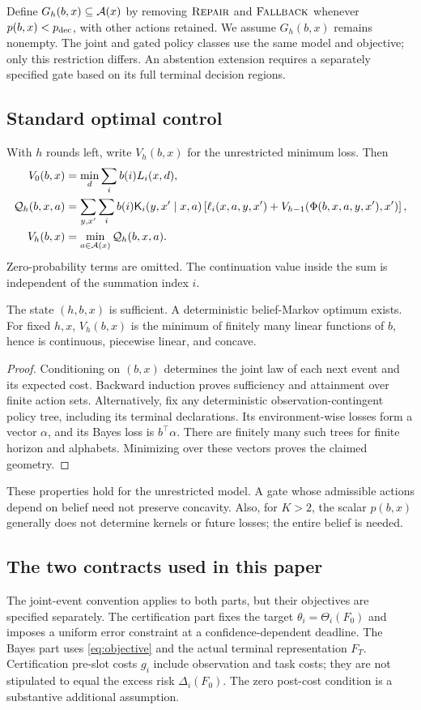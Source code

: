 Define $G_h(b,x)\subseteq\mathcal A(x)$ by removing $\textsc{Repair}$ and $\textsc{Fallback}$ whenever
$p(b,x)<p_{\mathrm{dec}}$, with other actions retained. We assume $G_h(b,x)$ remains
nonempty. The joint and gated policy classes use the same model and objective;
only this restriction differs. An abstention extension requires a separately
specified gate based on its full terminal decision regions.

\subsection{Standard optimal control}
With $h$ rounds left, write $V_h(b,x)$ for the unrestricted minimum loss.
Then
\begin{align}
V_0(b,x)&=\min_d\sum_i b(i)L_i(x,d),\\
\mathcal Q_h(b,x,a)&=\sum_{y,x'}\sum_i b(i)\mathsf K_i(y,x'\mid x,a)
 \left[\ell_i(x,a,y,x')+V_{h-1}(\Phi(b,x,a,y,x'),x')\right],\\
V_h(b,x)&=\min_{a\in\mathcal A(x)}\mathcal Q_h(b,x,a).
\label{eq:bellman}
\end{align}
Zero-probability terms are omitted. The continuation value inside the sum is
independent of the summation index $i$.

\begin{proposition}
\label{prop:standard}
The state $(h,b,x)$ is sufficient. A deterministic belief-Markov optimum exists.
For fixed $h,x$, $V_h(b,x)$ is the minimum of finitely many linear functions of
$b$, hence is continuous, piecewise linear, and concave.
\end{proposition}
\begin{proof}
Conditioning on $(b,x)$ determines the joint law of each next event and its
expected cost. Backward induction proves sufficiency and attainment over finite
action sets. Alternatively, fix any deterministic observation-contingent policy
tree, including its terminal declarations. Its environment-wise losses form a
vector $\alpha$, and its Bayes loss is $b^\top\alpha$. There are finitely many such
trees for finite horizon and alphabets. Minimizing over these vectors proves the
claimed geometry.
\end{proof}
These properties hold for the unrestricted model. A gate whose admissible
actions depend on belief need not preserve concavity. Also, for $K>2$, the scalar
$p(b,x)$ generally does not determine kernels or future losses; the entire belief
is needed.

\subsection{The two contracts used in this paper}
The joint-event convention applies to both parts, but their objectives are
specified separately. The certification part fixes the target
$\theta_i=\Theta_i(F_0)$ and imposes a uniform error constraint at a
confidence-dependent deadline. The Bayes part uses
\eqref{eq:objective} and the actual terminal representation $F_T$.
Certification pre-slot costs $g_i$ include observation and task costs;
they are not stipulated to equal the excess risk $\Delta_i(F_0)$.
The zero post-cost condition is a substantive additional assumption.


